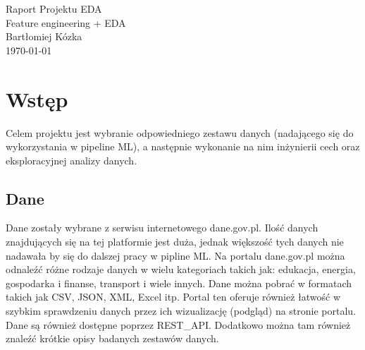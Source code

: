 \documentclass[10pt,a4paper]{article}
\begin{document}
\begin{titlepage}
    \centering
    \vspace*{5cm} %

    {\Huge Raport Projektu EDA} \\[1.5cm]

    {\Large Feature engineering + EDA} \\[2cm]

    {\large Bartłomiej Kózka} \\[0.5cm]

    {\large \today} %

    \vfill
	\restoregeometry 
\end{titlepage}


\justifying


\section{Wstęp}
Celem projektu jest wybranie odpowiedniego zestawu danych (nadającego się do wykorzystania w pipeline ML), a następnie wykonanie na nim inżynierii cech oraz eksploracyjnej analizy danych.
\subsection*{Dane}
Dane zostały wybrane z serwisu internetowego dane.gov.pl. Ilość danych znajdujących się na tej platformie jest duża, jednak większość tych danych nie nadawała by się do dalszej pracy w pipline ML. 
Na portalu dane.gov.pl można odnaleźć różne rodzaje danych w wielu kategoriach takich jak: edukacja, energia, gospodarka i finanse, transport i wiele innych. Dane można pobrać w formatach takich jak CSV, JSON, XML, Excel itp. Portal ten oferuje również łatwość w szybkim sprawdzeniu danych przez ich wizualizację (podgląd) na stronie portalu. Dane są również dostępne poprzez REST\_API. Dodatkowo można tam również znaleźć krótkie opisy badanych zestawów danych.
\end{document}
